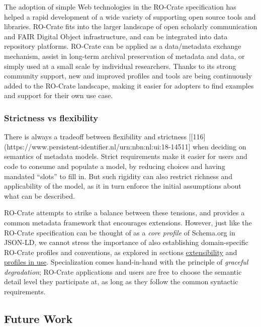 The adoption of simple Web technologies in the RO-Crate specification
has helped a rapid development of a wide variety of supporting open
source tools and libraries. RO-Crate fits into the larger landscape of
open scholarly communication and FAIR Digital Object infrastructure, and
can be integrated into data repository platforms. RO-Crate can be
applied as a data/metadata exchange mechanism, assist in long-term
archival preservation of metadata and data, or simply used at a small
scale by individual researchers. Thanks to its strong community support,
new and improved profiles and tools are being continuously added to the
RO-Crate landscape, making it easier for adopters to find examples and
support for their own use case.

\hypertarget{strictness-vs-flexibility}{%
\subsubsection{Strictness vs
flexibility}\label{strictness-vs-flexibility}}

There is always a tradeoff between flexibility and strictness
{[}{[}116{]}(https://www.persistent-identifier.nl/urn:nbn:nl:ui:18-14511{]}
when deciding on semantics of metadata models. Strict requirements make
it easier for users and code to consume and populate a model, by
reducing choices and having mandated ``slots'' to fill in. But such
rigidity can also restrict richness and applicability of the model, as
it in turn enforce the initial assumptions about what can be described.

RO-Crate attempts to strike a balance between these tensions, and
provides a common metadata framework that encourages extensions.
However, just like the RO-Crate specification can be thought of as a
\emph{core profile} of Schema.org in JSON-LD, we cannot stress the
importance of also establishing domain-specific RO-Crate profiles and
conventions, as explored in sections
\protect\hyperlink{profiles}{extensibility} and
\protect\hyperlink{inuse}{profiles in use}. Specialization comes
hand-in-hand with the principle of \emph{graceful degradation}; RO-Crate
applications and users are free to choose the semantic detail level they
participate at, as long as they follow the common syntactic
requirements.

\hypertarget{futurework}{%
\subsection{Future Work}\label{futurework}}

